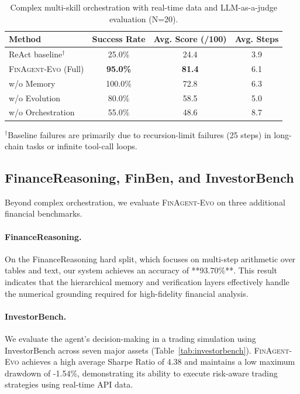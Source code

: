 \documentclass{article}
\begin{document}
\begin{table}[t]
\centering
\caption{Complex multi-skill orchestration with real-time data and LLM-as-a-judge evaluation (N=20).}
\label{tab:complex}
\begin{tabular}{lccc}
\toprule
Method & Success Rate & Avg. Score (/100) & Avg. Steps \\
\midrule
ReAct baseline$^\dagger$ & 25.0\% & 24.4 & 3.9 \\
\midrule
\textsc{FinAgent-Evo} (Full) & \textbf{95.0\%} & \textbf{81.4} & 6.1 \\
\quad w/o Memory & 100.0\% & 72.8 & 6.3 \\
\quad w/o Evolution & 80.0\% & 58.5 & 5.0 \\
\quad w/o Orchestration & 55.0\% & 48.6 & 8.7 \\
\bottomrule
\end{tabular}
\end{table}
\noindent$^\dagger$Baseline failures are primarily due to recursion-limit failures (25 steps) in long-chain tasks or infinite tool-call loops.

\subsection{FinanceReasoning, FinBen, and InvestorBench}
Beyond complex orchestration, we evaluate \textsc{FinAgent-Evo} on three additional financial benchmarks.

\paragraph{FinanceReasoning.}
On the FinanceReasoning hard split, which focuses on multi-step arithmetic over tables and text, our system achieves an accuracy of **93.70\%**. This result indicates that the hierarchical memory and verification layers effectively handle the numerical grounding required for high-fidelity financial analysis.

\paragraph{InvestorBench.}
We evaluate the agent's decision-making in a trading simulation using InvestorBench across seven major assets (Table~\ref{tab:investorbench}). \textsc{FinAgent-Evo} achieves a high average Sharpe Ratio of 4.38 and maintains a low maximum drawdown of -1.54\%, demonstrating its ability to execute risk-aware trading strategies using real-time API data.
\end{document}
